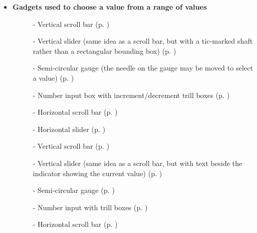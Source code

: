 \begin{itemize}
\item {\bf Gadgets used to choose a value from a range of values}
\begin{description}
\item[]  -  Vertical scroll bar (p. \pageref{scroll-bars})

\item[]  -  Vertical slider (same idea as a scroll bar, but with a
tic-marked shaft rather than a rectangular bounding box) (p. \pageref{sliders})

\item[]  -  Semi-circular gauge (the needle on the gauge may be
moved to select a value) (p. \pageref{gauge})

\item[]  -  Number input box with increment/decrement trill
boxes (p. \pageref{trill-device})

\item[]  -  Horizontal scroll bar (p. \pageref{scroll-bars})

\item[]  -  Horizontal slider (p. \pageref{sliders})

\item[]  - Vertical scroll bar (p. \pageref{motif-scroll-bars})

\item[]  - Vertical slider (same idea as a scroll bar, but with text
beside the indicator showing the current value) (p. \pageref{motif-slider})

\item[]  - Semi-circular gauge (p. \pageref{motif-gauge})

\item[]  - Number input with trill boxes
(p. \pageref{motif-trill-device})

\item[]  - Horizontal scroll bar
(p. \pageref{motif-scroll-bars})

\end{description}
\end{itemize}



